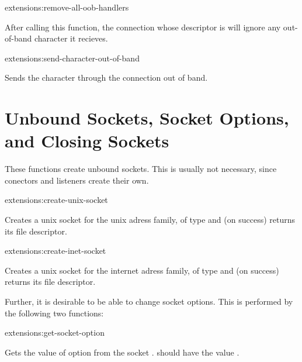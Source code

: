 \begin{defun}{extensions:}{remove-all-oob-handlers}{%
    }

  After calling this function, the connection whose descriptor is
   will ignore any out-of-band character it recieves.

\end{defun}

\begin{defun}{extensions:}{send-character-out-of-band}{%
    }

  Sends the character  through the connection  out
  of band.

\end{defun}

\section{Unbound Sockets, Socket Options, and Closing Sockets}

These functions create unbound sockets. This is usually not necessary,
since conectors and listeners create their own.

\begin{defun}{extensions:}{create-unix-socket}{%
    }
  
  Creates a unix socket for the unix adress family, of type
   and (on success) returns its file descriptor.

\end{defun}

\begin{defun}{extensions:}{create-inet-socket}{%
    }
  
  Creates a unix socket for the internet adress family, of type
   and (on success) returns its file descriptor.

\end{defun}

Further, it is desirable to be able to change socket options. This is
performed by the following two functions:

\begin{defun}{extensions:}{get-socket-option}{%
    }
  
  Gets the value of option  from the socket .
   should have the value .

\end{defun}

